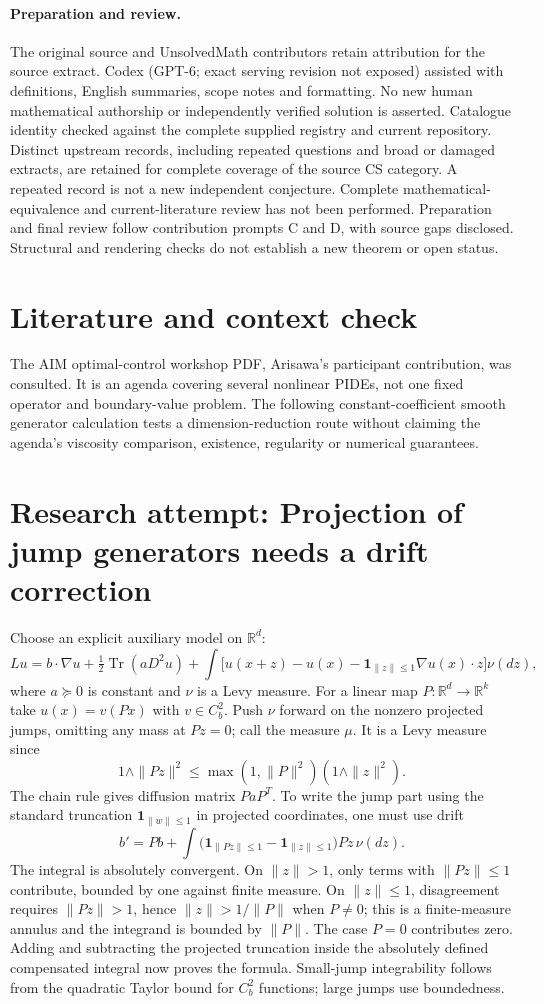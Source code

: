 \documentclass[11pt]{article}
\begin{document}
\paragraph{Preparation and review.}
The original source and UnsolvedMath contributors retain attribution for the source extract. Codex (GPT-6; exact serving revision not exposed) assisted with definitions, English summaries, scope notes and formatting. No new human mathematical authorship or independently verified solution is asserted. Catalogue identity checked against the complete supplied registry and current repository. Distinct upstream records, including repeated questions and broad or damaged extracts, are retained for complete coverage of the source CS category. A repeated record is not a new independent conjecture. Complete mathematical-equivalence and current-literature review has not been performed. Preparation and final review follow contribution prompts C and D, with source gaps disclosed. Structural and rendering checks do not establish a new theorem or open status.
\label{end:statement}

\section{Literature and context check}
The AIM optimal-control workshop PDF, Arisawa's participant contribution,
was consulted. It is an agenda covering several nonlinear PIDEs, not one fixed
operator and boundary-value problem. The following constant-coefficient smooth
generator calculation tests a dimension-reduction route without claiming the
agenda's viscosity comparison, existence, regularity or numerical guarantees.
\section{Research attempt: Projection of jump generators needs a drift correction}
Choose an explicit auxiliary model on $\mathbb R^d$:
\[
 Lu=b\cdot\nabla u+\tfrac12\operatorname{Tr}(aD^2u)
 +\int\big[u(x+z)-u(x)-\mathbf1_{\|z\|\le1}\nabla u(x)\cdot z\big]\nu(dz),
\]
where $a\succeq0$ is constant and $\nu$ is a Levy measure. For a linear map
$P:\mathbb R^d\to\mathbb R^k$ take $u(x)=v(Px)$ with $v\in C_b^2$.
Push $\nu$ forward on the nonzero projected jumps, omitting any mass at $Pz=0$;
call the measure $\mu$. It is a Levy measure since
\[
 1\wedge\|Pz\|^2\le\max(1,\|P\|^2)(1\wedge\|z\|^2).
\]
The chain rule gives diffusion matrix $PaP^T$. To write the jump part using
the standard truncation $\mathbf1_{\|w\|\le1}$ in projected coordinates, one
must use drift
\[
 b'=Pb+\int\big(\mathbf1_{\|Pz\|\le1}-\mathbf1_{\|z\|\le1}\big)Pz\,\nu(dz).
\]
The integral is absolutely convergent. On $\|z\|>1$, only terms with
$\|Pz\|\le1$ contribute, bounded by one against finite measure. On
$\|z\|\le1$, disagreement requires $\|Pz\|>1$, hence
$\|z\|>1/\|P\|$ when $P\ne0$; this is a finite-measure annulus and the
integrand is bounded by $\|P\|$. The case $P=0$ contributes zero. Adding and
subtracting the projected truncation inside the absolutely defined compensated
integral now proves the formula. Small-jump integrability follows from the
quadratic Taylor bound for $C_b^2$ functions; large jumps use boundedness.
\end{document}
